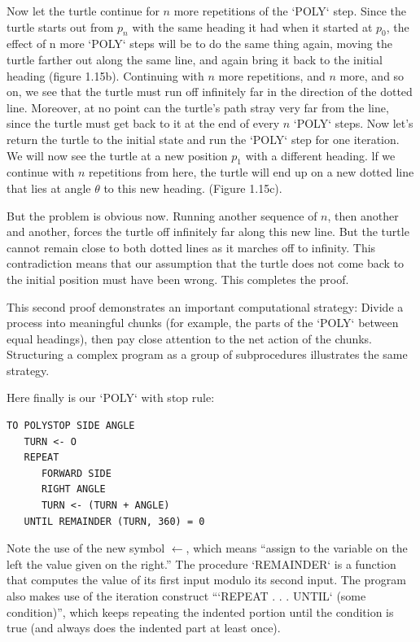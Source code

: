 \documentclass{book}
\begin{document}
Now let the turtle continue for $n$ more repetitions of the \textsc{`POLY`} step.
Since the turtle starts out from $p_n$ with the same heading it had when
it started at $p_0$, the effect of n more \textsc{`POLY`} steps will be to do the same
thing again, moving the turtle farther out along the same line, and again
bring it back to the initial heading (figure 1.15b). Continuing with $n$
more repetitions, and $n$ more, and so on, we see that the turtle must
run off infinitely far in the direction of the dotted line. Moreover, at no
point can the turtle's path stray very far from the line, since the turtle
must get back to it at the end of every $n$ \textsc{`POLY`} steps.
Now let's return the turtle to the initial state and run the \textsc{`POLY`} step
for one iteration. We will now see the turtle at a new position $p_1$ with a
different heading. lf we continue with $n$ repetitions from here, the turtle
will end up on a new dotted line that lies at angle $\theta$ to this new heading.
(Figure 1.15c).

But the problem is obvious now. Running another sequence of $n$,
then another and another, forces the turtle off infinitely far along this
new line. But the turtle cannot remain close to both dotted lines as it
marches off to infinity. This contradiction means that our assumption
that the turtle does not come back to the initial position must have been
wrong. This completes the proof.

This second proof demonstrates an important computational strategy:
Divide a process into meaningful chunks (for example, the parts of
the \textsc{`POLY`} between equal headings), then pay close attention to the net
action of the chunks. Structuring a complex program as a group of
subprocedures illustrates the same strategy.

Here finally is our \textsc{`POLY`} with stop rule:

\begin{verbatim}
TO POLYSTOP SIDE ANGLE
   TURN <- O
   REPEAT
      FORWARD SIDE
      RIGHT ANGLE
      TURN <- (TURN + ANGLE)
   UNTIL REMAINDER (TURN, 360) = 0
\end{verbatim}
Note the use of the new symbol $\leftarrow$, which means ``assign to the variable
on the left the value given on the right.'' The procedure \textsc{`REMAINDER`} is
a function that computes the value of its first input modulo its second
input. The program also makes use of the iteration construct ``\textsc{`REPEAT . . . UNTIL`} (some condition)'', which keeps repeating the indented portion
until the condition is true (and always does the indented part at least
once).
\end{document}
